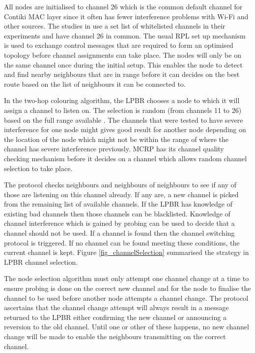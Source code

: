All nodes are initialised to channel 26 which is the common default channel for Contiki MAC layer since it often has fewer interference problems with Wi-Fi and other sources. The studies in \cite{chrysso, micmac, watteyne} use a set list of whitelisted channels in their experiments and have channel 26 in common. The usual RPL set up mechanism is used to exchange control messages that are required to form an optimised topology before channel assignments can take place. The nodes will only be on the same channel once during the initial setup.
This enables the node to detect and find nearby neighbours that are in range before it can decides on the best route based on the list of neighbours it can be connected to. 

In the two-hop colouring algorithm, the LPBR chooses a node to which it will assign a channel to listen on. The selection is random (from channels 11 to 26) based on the full range available \cite{ieee802.15.4}. The channels that were tested to have severe interference for one node might gives good result for another node depending on the location of the node which might not be within the range of where the channel has severe interference previously. MCRP has its channel quality checking mechanism before it decides on a channel which allows random channel selection to take place.


The protocol checks neighbours and neighbours of neighbours to see if any of those are listening on this channel already. If any are, a new channel is picked from the remaining list of available channels. If the LPBR has knowledge of existing bad channels then those channels can be blacklisted.  Knowledge of channel interference which is gained by probing can be used to decide that a channel should not be used. If a channel is found then the channel switching protocol is triggered. If no channel can be found meeting these conditions, the current channel is kept. Figure \ref{fig_channelSelection} summarised the strategy in LPBR channel selection. 

The node selection algorithm must only attempt one channel change at a time to ensure probing is done on the correct new channel and for the node to finalise the channel to be used before another node attempts a channel change.
The protocol ascertains that the channel change attempt will always result in a message returned to the LPBR either confirming the new channel or announcing a reversion to the old channel. Until one or other of these happens, no new channel change will be made to enable the neighbours transmitting on the correct channel.

